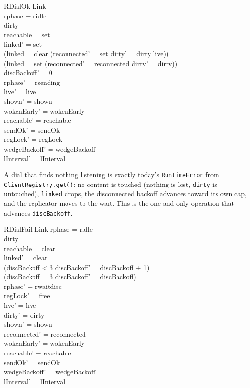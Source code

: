 \documentclass[a4paper,10pt,fleqn]{article}
\begin{document}
\begin{schema}{RDialOk}
  \Delta Link \\
\where
  rphase = ridle \\
  dirty \neq \emptyset \\
  reachable = set \\
  linked' = set \\
  (linked = clear \implies
    (reconnected' = set \land dirty' = dirty \cup live)) \\
  (linked = set \implies
    (reconnected' = reconnected \land dirty' = dirty)) \\
  discBackoff' = 0 \\
  rphase' = rsending \\
  live' = live \\ shown' = shown \\ wokenEarly' = wokenEarly \\
  reachable' = reachable \\ sendOk' = sendOk \\ regLock' = regLock \\
  wedgeBackoff' = wedgeBackoff \\ lInterval' = lInterval
\end{schema}

A dial that finds nothing listening is exactly today's \texttt{RuntimeError}
from \texttt{ClientRegistry.get()}: no content is touched (nothing is lost,
\texttt{dirty} is untouched), \texttt{linked} drops, the disconnected
backoff advances toward its own cap, and the replicator moves to the wait.
This is the one and only operation that advances \texttt{discBackoff}.

\begin{schema}{RDialFail}
  \Delta Link
\where
  rphase = ridle \\
  dirty \neq \emptyset \\
  reachable = clear \\
  linked' = clear \\
  (discBackoff < 3 \implies discBackoff' = discBackoff + 1) \\
  (discBackoff = 3 \implies discBackoff' = discBackoff) \\
  rphase' = rwaitdisc \\
  regLock' = free \\
  live' = live \\ dirty' = dirty \\ shown' = shown \\
  reconnected' = reconnected \\ wokenEarly' = wokenEarly \\
  reachable' = reachable \\ sendOk' = sendOk \\
  wedgeBackoff' = wedgeBackoff \\ lInterval' = lInterval
\end{schema}
\end{document}
